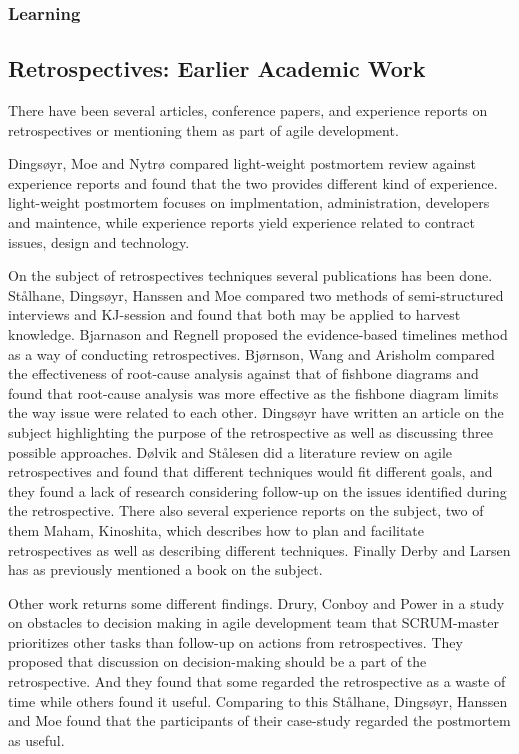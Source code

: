 \subsubsection{Learning}



\clearpage



\subsection{Retrospectives: Earlier Academic Work}
There have been several articles, conference papers, and experience reports on retrospectives or mentioning them as part of agile development.

Dingsøyr, Moe and Nytrø compared light-weight postmortem review against experience reports and found that the two provides different kind of experience. light-weight postmortem focuses on implmentation, administration, developers and maintence, while experience reports yield experience related to contract issues, design and technology. 

On the subject of retrospectives techniques several publications has been done. Stålhane, Dingsøyr, Hanssen and Moe\cite{Hanssen2003} compared two methods of semi-structured interviews and KJ-session and found that both may be applied to harvest knowledge. Bjarnason and Regnell\cite{Bjarnason2012} proposed the evidence-based timelines method as a way of conducting retrospectives. Bjørnson, Wang and Arisholm\cite{bjornson2009} compared the effectiveness of root-cause analysis against that of fishbone diagrams and found that root-cause analysis was more effective as the fishbone diagram limits the way issue were related to each other. Dingsøyr\cite{Dingsoyr2004} have written an article on the subject highlighting the purpose of the retrospective as well as discussing three possible approaches. Dølvik and Stålesen\cite{Dolvik2014} did a literature review on agile retrospectives and found that different techniques would fit different goals, and they found a lack of research considering follow-up on the issues identified during the retrospective. There also several experience reports on the subject, two of them Maham\cite{Maham2008}, Kinoshita\cite{Kinoshita2008}, which describes how to plan and facilitate retrospectives as well as describing different techniques. Finally Derby and Larsen\cite{Larsen2006} has as previously mentioned a book on the subject. 

Other work returns some different findings. Drury, Conboy and Power\cite{Drury2012} in a study on obstacles to decision making in agile development team that SCRUM-master prioritizes other tasks than follow-up on actions from retrospectives. They proposed that discussion on decision-making should be a part of the retrospective. And they found that some regarded the retrospective as a waste of time while others found it useful. Comparing to this Stålhane, Dingsøyr, Hanssen and Moe\cite{Hanssen2003} found that the participants of their case-study regarded the postmortem as useful. 

